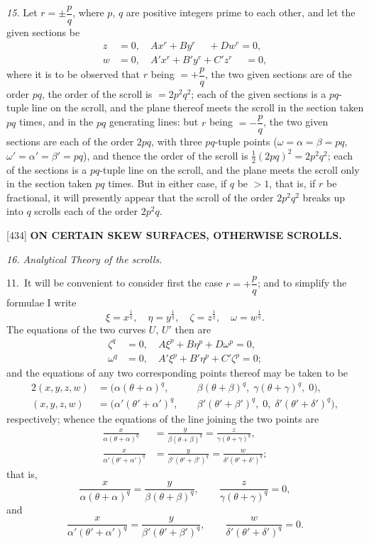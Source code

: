 \documentclass[12pt,a4paper]{article}
\newcommand{\paperref}[1]{\textup{[#1]}}
\theoremstyle{definition}
\begin{document}
\smallskip
\textit{15.}
Let $r = \pm\dfrac{p}{q}$, where $p$, $q$ are positive integers prime to each other, and let the given sections be
\begin{align*}
z &= 0, \quad Ax^r + By^r \quad\; + Dw^r = 0,\\
w &= 0, \quad A'x^r + B'y^r + C'z^r \quad\; = 0,
\end{align*}
where it is to be observed that $r$ being $= +\dfrac{p}{q}$, the two given sections are of the order $pq$, the order of the scroll is $= 2p^2q^2$; each of the given sections is a $pq$-tuple line on the scroll, and the plane thereof meets the scroll in the section taken $pq$ times, and in the $pq$ generating lines: but $r$ being $= -\dfrac{p}{q}$, the two given sections are each of the order $2pq$, with three $pq$-tuple points ($\omega = \alpha = \beta = pq$, $\omega' = \alpha' = \beta' = pq$), and thence the order of the scroll is $\frac{1}{2}(2pq)^2 = 2p^2q^2$; each of the sections is a $pq$-tuple line on the scroll, and the plane meets the scroll only in the section taken $pq$ times. But in either case, if $q$ be $> 1$, that is, if $r$ be fractional, it will presently appear that the scroll of the order $2p^2q^2$ breaks up into $q$ scrolls each of the order $2p^2q$.

\newpage
\setcounter{page}{61}

\noindent\paperref{434}\quad
\textbf{ON CERTAIN SKEW SURFACES, OTHERWISE SCROLLS.}

\textit{16. Analytical Theory of the scrolls.}

11.~It will be convenient to consider first the case $r = +\dfrac{p}{q}$; and to simplify the formulae I write
\[
\xi = x^{\frac{1}{q}}, \quad \eta = y^{\frac{1}{q}}, \quad \zeta = z^{\frac{1}{q}}, \quad \omega = w^{\frac{1}{q}}.
\]
The equations of the two curves $U$, $U'$ then are
\begin{align*}
\zeta^q &= 0, \quad A\xi^p + B\eta^p + D\omega^p = 0,\\
\omega^q &= 0, \quad A'\xi^p + B'\eta^p + C'\zeta^p = 0;
\end{align*}
and the equations of any two corresponding points thereof may be taken to be
\begin{alignat*}{2}
(x, y, z, w) &= (\alpha(\theta + \alpha)^q,\; &&\beta(\theta + \beta)^q,\; \gamma(\theta + \gamma)^q,\; 0),\\
(x, y, z, w) &= (\alpha'(\theta' + \alpha')^q,\; &&\beta'(\theta' + \beta')^q,\; 0,\; \delta'(\theta' + \delta')^q),
\end{alignat*}
respectively; whence the equations of the line joining the two points are
\begin{align*}
\frac{x}{\alpha(\theta + \alpha)^q} &= \frac{y}{\beta(\theta + \beta)^q} = \frac{z}{\gamma(\theta + \gamma)^q},\\
\frac{x}{\alpha'(\theta' + \alpha')^q} &= \frac{y}{\beta'(\theta' + \beta')^q} = \frac{w}{\delta'(\theta' + \delta')^q};
\end{align*}
that is,
\[
\frac{x}{\alpha(\theta + \alpha)^q} = \frac{y}{\beta(\theta + \beta)^q},
\qquad
\frac{z}{\gamma(\theta + \gamma)^q} = 0,
\]
and
\[
\frac{x}{\alpha'(\theta' + \alpha')^q} = \frac{y}{\beta'(\theta' + \beta')^q},
\qquad
\frac{w}{\delta'(\theta' + \delta')^q} = 0.
\]
\end{document}
